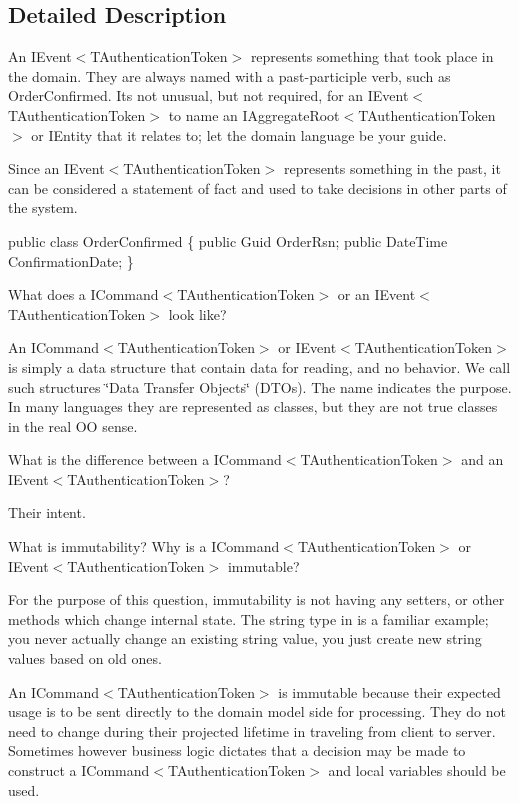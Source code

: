 \subsection{Detailed Description}
An I\+Event$<$\+T\+Authentication\+Token$>$ represents something that took place in the domain. They are always named with a past-\/participle verb, such as Order\+Confirmed. It\textquotesingle{}s not unusual, but not required, for an I\+Event$<$\+T\+Authentication\+Token$>$ to name an I\+Aggregate\+Root$<$\+T\+Authentication\+Token$>$ or I\+Entity that it relates to; let the domain language be your guide. 

Since an I\+Event$<$\+T\+Authentication\+Token$>$ represents something in the past, it can be considered a statement of fact and used to take decisions in other parts of the system. 

public class Order\+Confirmed \{ public Guid Order\+Rsn; public Date\+Time Confirmation\+Date; \} 

What does a I\+Command$<$\+T\+Authentication\+Token$>$ or an I\+Event$<$\+T\+Authentication\+Token$>$ look like?

An I\+Command$<$\+T\+Authentication\+Token$>$ or I\+Event$<$\+T\+Authentication\+Token$>$ is simply a data structure that contain data for reading, and no behavior. We call such structures \char`\"{}\+Data Transfer Objects\char`\"{} (D\+T\+Os). The name indicates the purpose. In many languages they are represented as classes, but they are not true classes in the real OO sense.

What is the difference between a I\+Command$<$\+T\+Authentication\+Token$>$ and an I\+Event$<$\+T\+Authentication\+Token$>$?

Their intent.

What is immutability? Why is a I\+Command$<$\+T\+Authentication\+Token$>$ or I\+Event$<$\+T\+Authentication\+Token$>$ immutable?

For the purpose of this question, immutability is not having any setters, or other methods which change internal state. The string type in is a familiar example; you never actually change an existing string value, you just create new string values based on old ones.

An I\+Command$<$\+T\+Authentication\+Token$>$ is immutable because their expected usage is to be sent directly to the domain model side for processing. They do not need to change during their projected lifetime in traveling from client to server. Sometimes however business logic dictates that a decision may be made to construct a I\+Command$<$\+T\+Authentication\+Token$>$ and local variables should be used.

